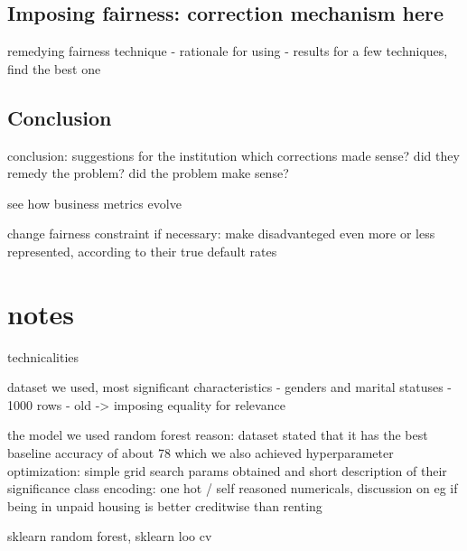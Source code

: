 \documentclass{article}
\begin{document}
\subsection*{Imposing fairness: correction mechanism here}
remedying fairness 
technique - rationale for using - results
for a few techniques, find the best one

\subsection*{Conclusion}

conclusion: suggestions for the institution
which corrections made sense? did they remedy the problem?
did the problem make sense?

see how business metrics evolve

change fairness constraint if necessary: make disadvanteged even more 
or less represented, according to their true default rates

\section*{notes}

technicalities 


dataset we used, most significant characteristics
    - genders and marital statuses
    - 1000 rows
    - old -> imposing equality for relevance

the model we used
    random forest
        reason: dataset stated that it has the best baseline accuracy of about 78%
            which we also achieved
    hyperparameter optimization: simple grid search
        params obtained and short description of their significance
    class encoding: one hot / self reasoned numericals, discussion on 
        eg if being in unpaid housing is better creditwise than renting  
        
sklearn random forest, sklearn loo cv


\printbibliography
\end{document}

